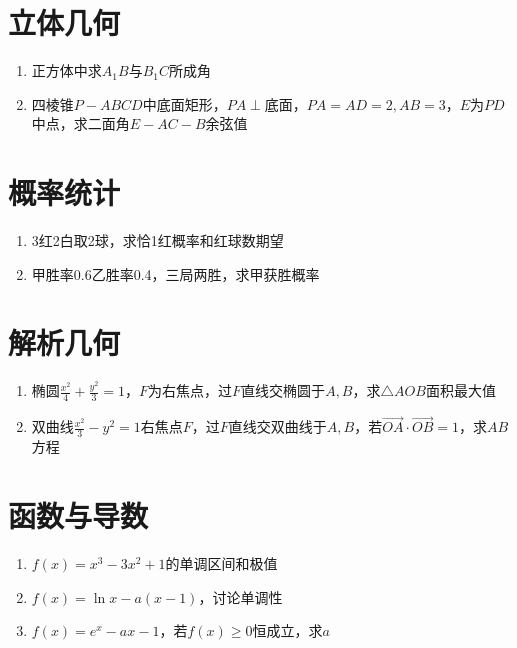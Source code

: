 \documentclass[12pt,a4paper]{ctexbook}
\begin{document}
\section{立体几何}
\begin{enumerate}
  \item[★] 正方体中求$A_1B$与$B_1C$所成角
  \item[★★] 四棱锥$P-ABCD$中底面矩形，$PA\perp$底面，$PA=AD=2,AB=3$，$E$为$PD$中点，求二面角$E-AC-B$余弦值
\end{enumerate}

\section{概率统计}
\begin{enumerate}
  \item[★] 3红2白取2球，求恰1红概率和红球数期望
  \item[★★] 甲胜率0.6乙胜率0.4，三局两胜，求甲获胜概率
\end{enumerate}

\section{解析几何}
\begin{enumerate}
  \item[★] 椭圆$\frac{x^2}{4}+\frac{y^2}{3}=1$，$F$为右焦点，过$F$直线交椭圆于$A,B$，求$\triangle AOB$面积最大值
  \item[★★] 双曲线$\frac{x^2}{3}-y^2=1$右焦点$F$，过$F$直线交双曲线于$A,B$，若$\overrightarrow{OA}\cdot\overrightarrow{OB}=1$，求$AB$方程
\end{enumerate}

\section{函数与导数}
\begin{enumerate}
  \item[★] $f(x)=x^3-3x^2+1$的单调区间和极值
  \item[★★] $f(x)=\ln x - a(x-1)$，讨论单调性
  \item[★★★] $f(x)=e^x-ax-1$，若$f(x)\ge0$恒成立，求$a$
\end{enumerate}

\appendix
\end{document}
